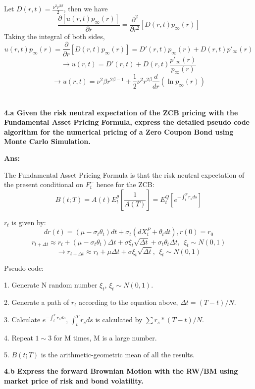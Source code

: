 \documentclass[11pt, notitlepage]{article}
\begin{document}
Let $D(r,t) = \frac{\nu^2 r^{2\beta}}{2}$, then we have
$$ \frac{\partial [u(r,t)p_\infty(r)]}{\partial r} = \frac{\partial^2}{\partial r^2} [D(r,t)p_\infty(r)]$$
Taking the integral of both sides,
$$u(r,t) p_\infty(r) =\frac{\partial}{\partial r} [D(r,t)p_\infty(r)] =  D'(r,t) p_\infty(r) + D(r,t)p'_\infty(r)$$
$$ \to u(r,t) = D'(r,t) + D(r,t) \frac{p'_\infty(r)}{p_\infty(r)}$$
$$ \to u(r,t) = \nu ^2 \beta r^{2\beta-1} + \frac{1}{2} \nu^2 r^{2\beta} \frac{d}{dr}(\ln p_\infty(r))$$


\newpage
\vspace{5mm}
\section{}
\color{red}
\bfseries
4.a Given the risk neutral expectation of the ZCB pricing with the Fundamental Asset Pricing Formula, express the detailed pseudo code algorithm for the numerical pricing of a Zero Coupon Bond using Monte Carlo Simulation.
\mdseries

\vspace{5mm}
\color{black}
\textbf {Ans:}

The Fundamental Asset Pricing Formula is that the risk neutral expectation of the present conditional on $F_t^-$ hence for the ZCB:
$$ B(t;T) =  A(t) E_t^\theta [ \frac{1}{A(T)}]  = E_t^Q[e^{-\int_t^T r_sds}]$$

$r_t$ is given by:
$$dr(t) = (\mu - \sigma_t\theta_t)dt + \sigma_t (dX_t^P + \theta_tdt), r(0) = r_0$$
$$ r_{t+\Delta t} \approx r_t + (\mu - \sigma_t \theta_t) \Delta t + \sigma \xi_t \sqrt{\Delta t} +\sigma_t \theta_t \Delta t,~~\xi_t \sim N(0,1)$$
$$\to r_{t+\Delta t} \approx r_t + \mu \Delta t + \sigma \xi_t \sqrt{\Delta t},~~\xi_t \sim N(0,1)$$

Pseudo code:

1. Generate N random number $\xi_t$, $\xi_t \sim N(0,1)$.

2. Generate a path of $r_t$ according to the equation above, $\Delta t = (T-t)/N$.

3. Calculate $e^{-\int_t^T r_s ds}$,  $\int_t^T r_s ds$ is calculated by $\sum r_s * (T-t)/N$.

4. Repeat $1 \sim 3$ for M times, M is a large number.

5. $B(t;T)$ is the arithmetic-geometric mean of all the results.

\vspace{10mm}
\color{red}
\bfseries
4.b Express the forward Brownian Motion with the RW/BM using market price of risk and bond volatility.
\mdseries
\end{document}
